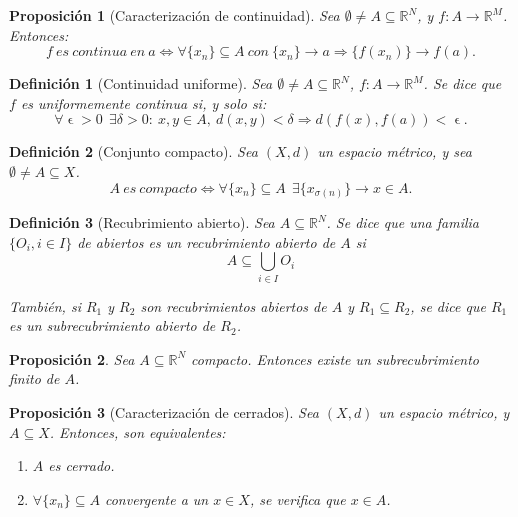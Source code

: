 \documentclass[11pt, a4paper, titlepage]{article}
\let\epsilon\upvarepsilon
\theoremstyle{theorem-style}
\newtheorem*{nprop}{Proposición}
\theoremstyle{definition-style}
\newtheorem*{ndef}{Definición}
\theoremstyle{remark-style}
\theoremstyle{example-style}
\newenvironment{nlist}
{\begin{enumerate}
\renewcommand\labelenumi{(\emph{\roman{enumi})}}}
{\end{enumerate}}
\begin{document}
\begin{nprop}[Caracterización de continuidad]
Sea $\emptyset \ne A \subseteq \mathbb{R}^N$, y $f:A\longrightarrow \mathbb{R}^M$. Entonces: $$f\ es\ continua\ en\ a \iff \forall \{x_n\}\subseteq A\ con\ \{x_n\} \rightarrow a \Rightarrow \{f(x_n)\} \rightarrow f(a).$$
\end{nprop}



\begin{ndef}[Continuidad uniforme]
Sea $\emptyset \ne A \subseteq \mathbb{R}^N$, $f:A \longrightarrow \mathbb{R}^M$. Se dice que $f$ es uniformemente continua si, y solo si: $$\forall \epsilon > 0 \ \ \exists \delta > 0 : \ x,y \in A,\ d(x,y) < \delta \Rightarrow d(f(x),f(a)) < \epsilon.$$
\end{ndef}


\begin{ndef}[Conjunto compacto]
Sea $(X,d)$ un espacio métrico, y sea $\emptyset \ne A \subseteq X$. $$A\ es\ compacto \iff \forall \{x_n\} \subseteq A\ \ \exists \{x_{\sigma(n)}\} \rightarrow x\in A.$$
\end{ndef}

\begin{ndef}[Recubrimiento abierto]
	Sea $A \subseteq \mathbb{R}^N$. Se dice que una familia $\{O_i, i\in I\}$ de abiertos es un \emph{recubrimiento abierto} de $A$ si
	\[
		A \subseteq \bigcup_{i\in I} O_i
	\]
	
	También, si $R_1$ y $R_2$ son recubrimientos abiertos de $A$ y $R_1 \subseteq R_2$, se dice que $R_1$ es un \emph{subrecubrimiento abierto} de $R_2$.
\end{ndef}

\begin{nprop}
	Sea $A \subseteq \mathbb{R}^N$ compacto. Entonces existe un subrecubrimiento finito de $A$.
\end{nprop}

\begin{nprop}[Caracterización de cerrados]
Sea $(X,d)$ un espacio métrico, y $A\subseteq X$. Entonces, son equivalentes:

\begin{nlist}
\item $A$ es cerrado.
\item $\forall \{x_n\} \subseteq A$ convergente a un $x \in X$, se verifica que $x\in A$.
\end{nlist}

\end{nprop}
\end{document}
